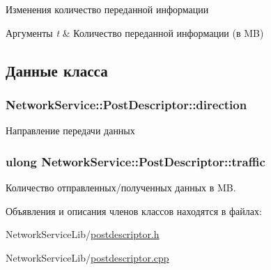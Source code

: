 Изменения количество переданной информации 


\begin{DoxyParams}{Аргументы}
{\em t} & Количество переданной информации (в M\+B) \\
\hline
\end{DoxyParams}


\subsection{Данные класса}
\hypertarget{class_network_service_1_1_post_descriptor_a04faf66e747b2d4f2d89bf1e92f4ab5c}{}
\subsubsection[{direction}]{ Network\+Service\+::\+Post\+Descriptor\+::direction\hspace{0.3cm}{\ttfamily [private]}}\label{class_network_service_1_1_post_descriptor_a04faf66e747b2d4f2d89bf1e92f4ab5c}


Направление передачи данных 

\hypertarget{class_network_service_1_1_post_descriptor_ae2eef559828a42ec299ab59711f88e59}{}
\subsubsection[{traffic}]{\setlength{\rightskip}{0pt plus 5cm}ulong Network\+Service\+::\+Post\+Descriptor\+::traffic\hspace{0.3cm}{\ttfamily [private]}}\label{class_network_service_1_1_post_descriptor_ae2eef559828a42ec299ab59711f88e59}


Количество отправленных/полученных данных в M\+B. 



Объявления и описания членов классов находятся в файлах\+:\begin{DoxyCompactItemize}
\item 
Network\+Service\+Lib/\hyperlink{postdescriptor_8h}{postdescriptor.\+h}\item 
Network\+Service\+Lib/\hyperlink{postdescriptor_8cpp}{postdescriptor.\+cpp}\end{DoxyCompactItemize}
